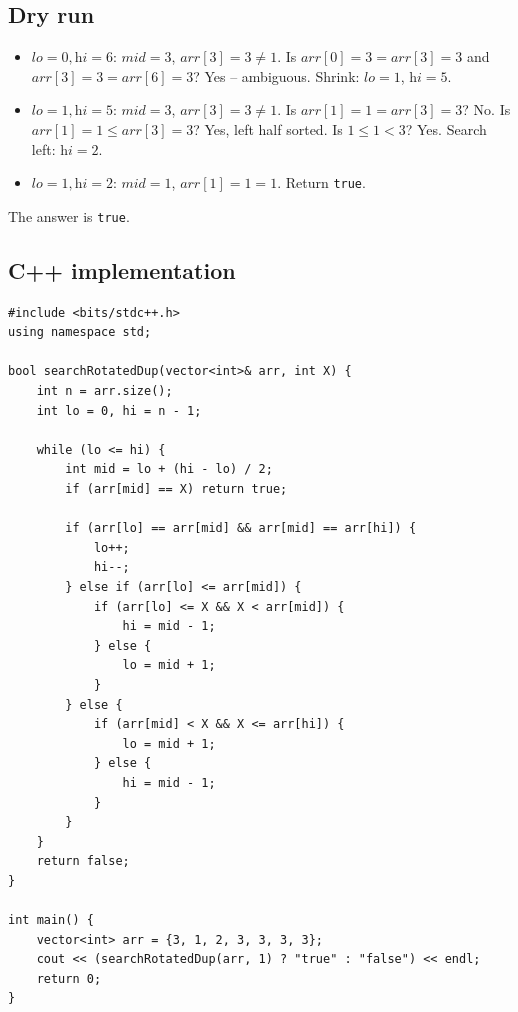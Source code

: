 \subsection*{Dry run}


\begin{itemize}
  \item $\textit{lo}=0,\textit{hi}=6$: $\textit{mid}=3$,
        $\textit{arr}[3]=3 \ne 1$. Is $\textit{arr}[0]=3=\textit{arr}[3]=3$
        and $\textit{arr}[3]=3=\textit{arr}[6]=3$? Yes -- ambiguous. Shrink:
        $\textit{lo}=1$, $\textit{hi}=5$.
  \item $\textit{lo}=1,\textit{hi}=5$: $\textit{mid}=3$,
        $\textit{arr}[3]=3 \ne 1$. Is $\textit{arr}[1]=1=\textit{arr}[3]=3$?
        No. Is $\textit{arr}[1]=1 \le \textit{arr}[3]=3$? Yes, left half
        sorted. Is $1 \le 1 < 3$? Yes. Search left: $\textit{hi}=2$.
  \item $\textit{lo}=1,\textit{hi}=2$: $\textit{mid}=1$,
        $\textit{arr}[1]=1=1$. Return \texttt{true}.
\end{itemize}

The answer is \texttt{true}.

\subsection*{C++ implementation}

\begin{lstlisting}
#include <bits/stdc++.h>
using namespace std;

bool searchRotatedDup(vector<int>& arr, int X) {
    int n = arr.size();
    int lo = 0, hi = n - 1;

    while (lo <= hi) {
        int mid = lo + (hi - lo) / 2;
        if (arr[mid] == X) return true;

        if (arr[lo] == arr[mid] && arr[mid] == arr[hi]) {
            lo++;
            hi--;
        } else if (arr[lo] <= arr[mid]) {
            if (arr[lo] <= X && X < arr[mid]) {
                hi = mid - 1;
            } else {
                lo = mid + 1;
            }
        } else {
            if (arr[mid] < X && X <= arr[hi]) {
                lo = mid + 1;
            } else {
                hi = mid - 1;
            }
        }
    }
    return false;
}

int main() {
    vector<int> arr = {3, 1, 2, 3, 3, 3, 3};
    cout << (searchRotatedDup(arr, 1) ? "true" : "false") << endl;
    return 0;
}
\end{lstlisting}

